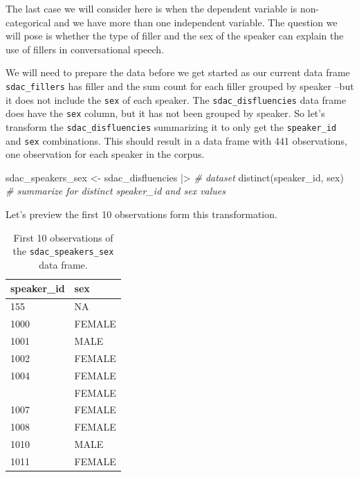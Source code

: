 \documentclass[
  letterpaper,
]{latex/krantz}
\newenvironment{Shaded}{\begin{snugshade}}{\end{snugshade}}
\newcommand{\CommentTok}[1]{\textcolor[rgb]{0.00,0.00,0.00}{\textit{#1}}}
\newcommand{\FunctionTok}[1]{\textcolor[rgb]{0.00,0.00,0.00}{#1}}
\newcommand{\NormalTok}[1]{\textcolor[rgb]{0.00,0.00,0.00}{#1}}
\newcommand{\OtherTok}[1]{\textcolor[rgb]{0.00,0.00,0.00}{#1}}
\newcommand{\SpecialCharTok}[1]{\textcolor[rgb]{0.00,0.00,0.00}{#1}}
\begin{document}
The last case we will consider here is when the dependent variable is
non-categorical and we have more than one independent variable. The
question we will pose is whether the type of filler and the sex of the
speaker can explain the use of fillers in conversational speech.

We will need to prepare the data before we get started as our current
data frame \texttt{sdac\_fillers} has filler and the sum count for each
filler grouped by speaker --but it does not include the \texttt{sex} of
each speaker. The \texttt{sdac\_disfluencies} data frame does have the
\texttt{sex} column, but it has not been grouped by speaker. So let's
transform the \texttt{sdac\_disfluencies} summarizing it to only get the
\texttt{speaker\_id} and \texttt{sex} combinations. This should result
in a data frame with 441 observations, one observation for each speaker
in the corpus.

\begin{Shaded}
\begin{Highlighting}[]
\NormalTok{sdac\_speakers\_sex }\OtherTok{\textless{}{-}} 
\NormalTok{  sdac\_disfluencies }\SpecialCharTok{|\textgreater{}} \CommentTok{\# dataset}
  \FunctionTok{distinct}\NormalTok{(speaker\_id, sex) }\CommentTok{\# summarize for distinct \textasciigrave{}speaker\_id\textasciigrave{} and \textasciigrave{}sex\textasciigrave{} values}
\end{Highlighting}
\end{Shaded}

Let's preview the first 10 observations form this transformation.

\hypertarget{tbl-i-multi-cont-transform-sdac-preview}{}
\begin{table}
\caption{\label{tbl-i-multi-cont-transform-sdac-preview}First 10 observations of the \texttt{sdac\_speakers\_sex} data frame. }\tabularnewline

\centering
\begin{tabular}{ll}
\toprule
speaker\_id & sex\\
\midrule
155 & NA\\
1000 & FEMALE\\
1001 & MALE\\
1002 & FEMALE\\
1004 & FEMALE\\
\addlinespace
1005 & FEMALE\\
1007 & FEMALE\\
1008 & FEMALE\\
1010 & MALE\\
1011 & FEMALE\\
\bottomrule
\end{tabular}
\end{table}
\end{document}
